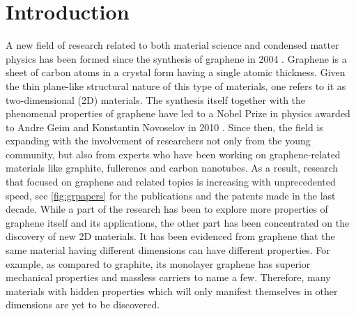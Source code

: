 
\chapter{Introduction \label{chap:1}}  %

\ifpdf
    \graphicspath{{Chapter1/Figs/Raster/}{Chapter1/Figs/PDF/}{Chapter1/Figs/}{Chapter1/Figs/Vector/}}
\else
    \graphicspath{{Chapter1/Figs/Vector/}{Chapter1/Figs/}}
\fi

A new field of research related to both material science and condensed matter physics has been formed since the synthesis of graphene in 2004 \cite{Novoselov666,Novoselov26072005}. Graphene is a sheet of carbon atoms in a crystal form having a single atomic thickness. Given the thin plane-like structural nature of this type of materials, one refers to it as two-dimensional (2D) materials. The synthesis itself together with the phenomenal properties of graphene have led to a Nobel Prize in physics awarded to Andre Geim and Konstantin Novoselov in 2010 \cite{Geim2007}. Since then, the field is expanding with the involvement of researchers not only from the young community, but also from experts who have been working on graphene-related materials like graphite, fullerenes and carbon nanotubes. As a result, research that focused on graphene and related topics is increasing with unprecedented speed, see \autoref{fig:grpapers} for the publications and the patents made in the last decade. While a part of the research has been to explore more properties of graphene itself and its applications, the other part has been concentrated on the discovery of new 2D materials. It has been evidenced from graphene that the same material having different dimensions can have different properties. For example, as compared to graphite, its monolayer graphene has superior mechanical properties and massless carriers to name a few. Therefore, many materials with hidden properties which will only manifest themselves in other dimensions are yet to be discovered. 


